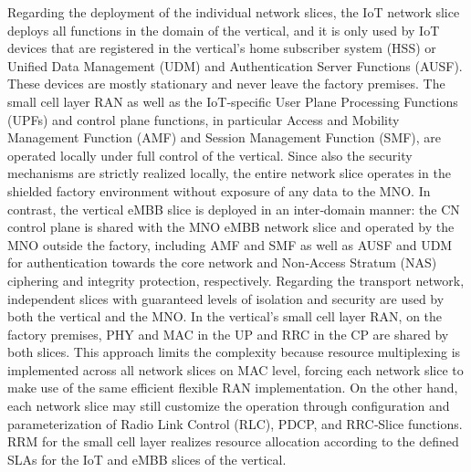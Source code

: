 \documentclass{article}
\begin{document}
Regarding the deployment of the individual network slices, the IoT network slice deploys all functions in the domain of the vertical, and it is only used by IoT
devices that are registered in the vertical’s home subscriber system (HSS) or Unified Data Management
(UDM) and Authentication Server Functions (AUSF). These devices are mostly stationary and never
leave the factory premises. The small cell layer RAN as well as the IoT‐specific User Plane Processing
Functions (UPFs) and control plane functions, in particular Access and Mobility Management
Function (AMF) and Session Management Function (SMF), are operated locally under full control of
the vertical. Since also the security mechanisms are strictly realized locally, the entire network slice operates in the shielded factory environment without exposure of any data to the MNO. In contrast, the vertical eMBB slice is deployed
in an inter‐domain manner: the CN control plane is shared with the MNO
eMBB network slice and operated by the MNO outside the factory, including AMF and SMF as well
as AUSF and UDM for authentication towards the core network and Non‐Access Stratum (NAS)
ciphering and integrity protection, respectively. Regarding the transport network, independent slices
with guaranteed levels of isolation and security are used by both the vertical and the MNO. In the vertical’s small cell layer RAN, on the factory premises, PHY and MAC in the UP
and RRC in the CP are shared by both slices. This approach limits the complexity because resource
multiplexing is implemented across all network slices on MAC level, forcing each network slice to
make use of the same efficient flexible RAN implementation. On the other hand, each network slice
may still customize the operation through configuration and parameterization of Radio Link Control
(RLC), PDCP, and RRC‐Slice functions. RRM for the small cell layer realizes resource allocation
according to the defined SLAs for the IoT and eMBB slices of the vertical.
\end{document}
